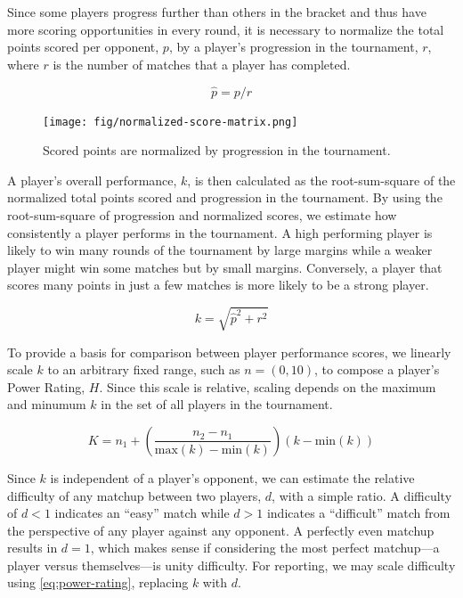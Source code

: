 \documentclass[letterpaper, 10 pt, conference]{ieeeconf}  %
\begin{document}
Since some players progress further than others in the bracket and thus have
more scoring opportunities in every round, it is necessary to normalize the
total points scored per opponent, $p$, by a player's progression in the
tournament, $r$, where $r$ is the number of matches that a player has completed.


\begin{equation}
        \hat{p} = p/r
        \label{eq:normalized-score}
\end{equation}

\begin{figure}[ht]
        \texttt{[image: fig/normalized-score-matrix.png]}
        \label{fig:normalized-score}
        \centering
        \caption{Scored points are normalized by progression in the tournament.}
\end{figure}

A player's overall performance, $k$, is then calculated as the root-sum-square
of the normalized total points scored and progression in the tournament. By
using the root-sum-square of progression and normalized scores, we estimate how
consistently a player performs in the tournament. A high performing player is
likely to win many rounds of the tournament by large margins while a weaker
player might win some matches but by small margins. Conversely, a player that
scores many points in just a few matches is more likely to be a strong player.

\begin{equation}
        k = \sqrt{\hat{p}^2 + r^2}
        \label{eq:skill-indicator}
\end{equation}

To provide a basis for comparison between player performance scores, we linearly
scale $k$ to an arbitrary fixed range, such as $n = (0,10)$, to compose a
player's Power Rating, $H$. Since this scale is relative, scaling depends on the
maximum and minumum $k$ in the set of all players in the tournament.

\begin{equation}
        K = n_1 + \left(\frac{n_2 - n_1}{\text{max}(k) - \text{min}(k)}\right)(k - \text{min}(k))  
        \label{eq:power-rating}
\end{equation}

Since $k$ is independent of a player's opponent, we can estimate the relative
difficulty of any matchup between two players, $d$, with a simple ratio. A
difficulty of $d<1$ indicates an ``easy'' match while $d>1$ indicates a
``difficult'' match from the perspective of any player against any opponent. A
perfectly even matchup results in $d=1$, which makes sense if considering the
most perfect matchup---a player versus themselves---is unity difficulty. For
reporting, we may scale difficulty using \autoref{eq:power-rating}, replacing
$k$ with $d$. 
\end{document}
